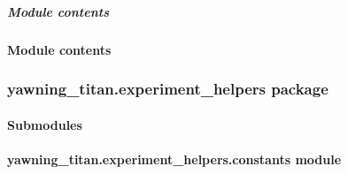 \documentclass[letterpaper,10pt,english]{sphinxmanual}
\begin{document}
\subparagraph{Module contents}
\label{\detokenize{source/yawning_titan.envs.specific:module-yawning_titan.envs.specific}}\label{\detokenize{source/yawning_titan.envs.specific:module-contents}}

\paragraph{Module contents}
\label{\detokenize{source/yawning_titan.envs:module-yawning_titan.envs}}\label{\detokenize{source/yawning_titan.envs:module-contents}}

\subsubsection{yawning\_titan.experiment\_helpers package}
\label{\detokenize{source/yawning_titan.experiment_helpers:yawning-titan-experiment-helpers-package}}\label{\detokenize{source/yawning_titan.experiment_helpers::doc}}

\paragraph{Submodules}
\label{\detokenize{source/yawning_titan.experiment_helpers:submodules}}

\paragraph{yawning\_titan.experiment\_helpers.constants module}
\label{\detokenize{source/yawning_titan.experiment_helpers:module-yawning_titan.experiment_helpers.constants}}\label{\detokenize{source/yawning_titan.experiment_helpers:yawning-titan-experiment-helpers-constants-module}}
\end{document}
